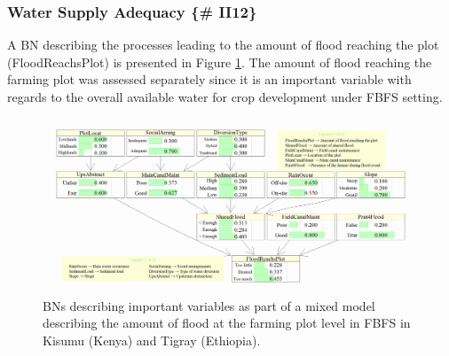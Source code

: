 \documentclass[12pt,oneside]{article}
\begin{document}
\hypertarget{water-supply-adequacy-ii12}{%
\subsubsection{Water Supply Adequacy \{\# II12\}}\label{water-supply-adequacy-ii12}}

A BN describing the processes leading to the amount of flood reaching the plot (FloodReachsPlot) is presented in Figure \ref{fig:fig2}. The amount of flood reaching the farming plot was assessed separately since it is an important variable with regards to the overall available water for crop development under FBFS setting.

\begin{figure}[!htbp]

{\centering \includegraphics[width=1\linewidth,]{figures/Modelling_FBFS_Suppl_flood_reaching_plot_BNs_plot} 

}

\caption{BNs describing important variables as part of a mixed model describing the amount of flood at the farming plot level in FBFS in Kisumu (Kenya) and Tigray (Ethiopia).}\label{fig:fig2}
\end{figure}
\end{document}
